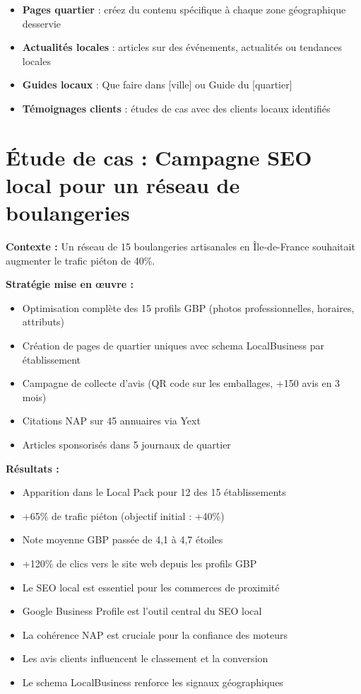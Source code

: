 \documentclass[12pt,a4paper,twoside]{report}
\begin{document}
\begin{itemize}
    \item \textbf{Pages quartier} : créez du contenu spécifique à chaque zone géographique desservie
    \item \textbf{Actualités locales} : articles sur des événements, actualités ou tendances locales
    \item \textbf{Guides locaux} : \og Que faire dans [ville]\fg{} ou \og Guide du [quartier]\fg{}
    \item \textbf{Témoignages clients} : études de cas avec des clients locaux identifiés
\end{itemize}

\section{Étude de cas : Campagne SEO local pour un réseau de boulangeries}

\textbf{Contexte :} Un réseau de 15 boulangeries artisanales en Île-de-France souhaitait augmenter le trafic piéton de 40\%.

\textbf{Stratégie mise en œuvre :}
\begin{itemize}
    \item Optimisation complète des 15 profils GBP (photos professionnelles, horaires, attributs)
    \item Création de pages de quartier uniques avec schema LocalBusiness par établissement
    \item Campagne de collecte d'avis (QR code sur les emballages, +150 avis en 3 mois)
    \item Citations NAP sur 45 annuaires via Yext
    \item Articles sponsorisés dans 5 journaux de quartier
\end{itemize}

\textbf{Résultats :}
\begin{itemize}
    \item Apparition dans le Local Pack pour 12 des 15 établissements
    \item +65\% de trafic piéton (objectif initial : +40\%)
    \item Note moyenne GBP passée de 4,1 à 4,7 étoiles
    \item +120\% de clics vers le site web depuis les profils GBP
\end{itemize}

\begin{takeaways}
\begin{itemize}
    \item Le SEO local est essentiel pour les commerces de proximité
    \item Google Business Profile est l'outil central du SEO local
    \item La cohérence NAP est cruciale pour la confiance des moteurs
    \item Les avis clients influencent le classement et la conversion
    \item Le schema LocalBusiness renforce les signaux géographiques
\end{itemize}
\end{takeaways}
\end{document}
